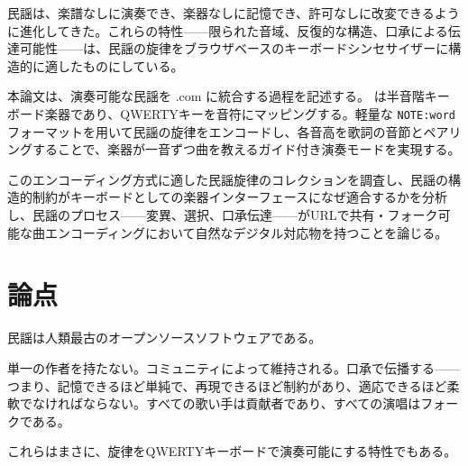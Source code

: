 \documentclass[11pt]{article}
\begin{document}
\clearpage
\begin{accentcard}

民謡は、楽譜なしに演奏でき、楽器なしに記憶でき、許可なしに改変できるように進化してきた。これらの特性——限られた音域、反復的な構造、口承による伝達可能性——は、民謡の旋律をブラウザベースのキーボードシンセサイザーに構造的に適したものにしている。

\vspace{0.3em}

本論文は、演奏可能な民謡を \np{}.com に統合する過程を記述する。\np{} は半音階キーボード楽器であり、QWERTYキーを音符にマッピングする。軽量な \texttt{NOTE:word} フォーマットを用いて民謡の旋律をエンコードし、各音高を歌詞の音節とペアリングすることで、楽器が一音ずつ曲を教えるガイド付き演奏モードを実現する。

\vspace{0.3em}

このエンコーディング方式に適した民謡旋律のコレクションを調査し、民謡の構造的制約がキーボードとしての楽器インターフェースになぜ適合するかを分析し、民謡のプロセス——変異、選択、口承伝達——がURLで共有・フォーク可能な曲エンコーディングにおいて自然なデジタル対応物を持つことを論じる。
\end{accentcard}

\section{論点}

民謡は人類最古のオープンソースソフトウェアである。

単一の作者を持たない。コミュニティによって維持される。口承で伝播する——つまり、記憶できるほど単純で、再現できるほど制約があり、適応できるほど柔軟でなければならない。すべての歌い手は貢献者であり、すべての演唱はフォークである。

\vspace{0.3em}

これらはまさに、旋律をQWERTYキーボードで演奏可能にする特性でもある。
\end{document}
